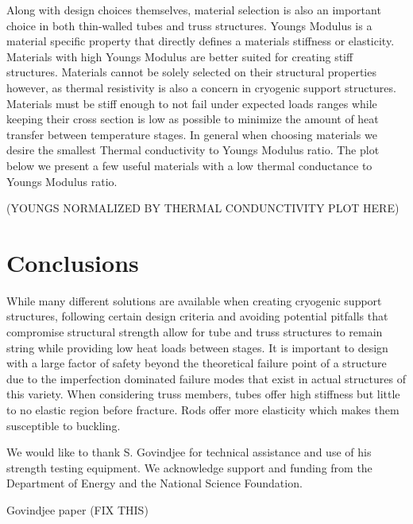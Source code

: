 \documentclass[final]{svjour2}
\begin{document}
Along with design choices themselves, material selection is also an important  choice in both thin-walled tubes and truss structures. Youngs Modulus is a material specific property that directly defines a materials stiffness or elasticity.  Materials with high Youngs Modulus are better suited for creating stiff structures. Materials cannot be solely selected on their structural properties however, as thermal resistivity is also a concern in cryogenic support structures.  Materials must be stiff enough to not fail under expected loads ranges while keeping their cross section is low as possible to minimize the amount of heat transfer between temperature stages.  In general when choosing materials we desire the smallest Thermal conductivity to Youngs Modulus ratio.  The plot below we present a few useful materials with a low thermal conductance to Youngs Modulus ratio.

(YOUNGS NORMALIZED BY THERMAL CONDUNCTIVITY PLOT HERE)

\section{Conclusions}
While many different solutions are available when creating cryogenic support structures, following certain design criteria and avoiding potential pitfalls that compromise structural strength allow for tube and truss structures to remain string while providing low heat loads between stages.  It is important to design with a large factor of safety beyond the theoretical failure point of a structure due to the imperfection dominated failure modes that exist in actual structures of this variety.  When considering truss members, tubes offer high stiffness but little to no elastic region before fracture.  Rods offer more elasticity which makes them susceptible to buckling.

\begin{acknowledgements}
We would like to thank S. Govindjee for technical assistance and use of his strength testing equipment. We acknowledge support and funding from the Department of Energy and the National Science Foundation.
\end{acknowledgements}

\pagebreak

\begin{thebibliography}{99}

Govindjee paper (FIX THIS)

\end{thebibliography}
\end{document}

